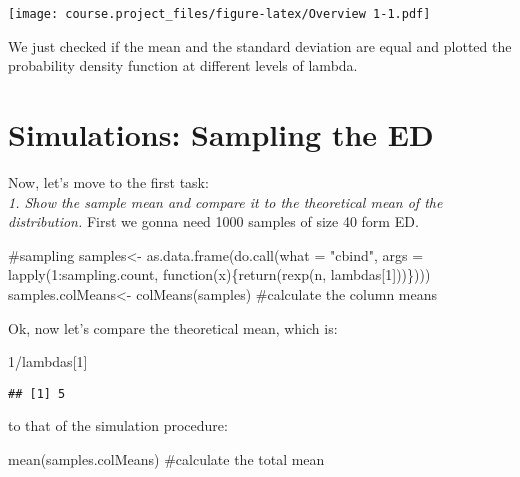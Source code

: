 \documentclass[9pt,]{article}
\newenvironment{Shaded}{}{}
\newcommand{\KeywordTok}[1]{\textcolor[rgb]{0.00,0.00,1.00}{{#1}}}
\newcommand{\DataTypeTok}[1]{{#1}}
\newcommand{\DecValTok}[1]{{#1}}
\newcommand{\StringTok}[1]{\textcolor[rgb]{0.00,0.50,0.50}{{#1}}}
\newcommand{\CommentTok}[1]{\textcolor[rgb]{0.00,0.50,0.00}{{#1}}}
\newcommand{\NormalTok}[1]{{#1}}
\begin{document}
\texttt{[image: course.project\_files/figure-latex/Overview 1-1.pdf]}

We just checked if the mean and the standard deviation are equal and
plotted the probability density function at different levels of lambda.

\section{Simulations: Sampling the
ED}\label{simulations-sampling-the-ed}

Now, let's move to the first task:\\
\emph{1. Show the sample mean and compare it to the theoretical mean of
the distribution.} First we gonna need 1000 samples of size 40 form ED.

\begin{Shaded}
\begin{Highlighting}[]
\CommentTok{#sampling}
\NormalTok{samples<-}\StringTok{ }\KeywordTok{as.data.frame}\NormalTok{(}\KeywordTok{do.call}\NormalTok{(}\DataTypeTok{what =} \StringTok{"cbind"}\NormalTok{, }\DataTypeTok{args =} \KeywordTok{lapply}\NormalTok{(}\DecValTok{1}\NormalTok{:sampling.count, function(x)\{}\KeywordTok{return}\NormalTok{(}\KeywordTok{rexp}\NormalTok{(n, lambdas[}\DecValTok{1}\NormalTok{]))\})))}
\NormalTok{samples.colMeans<-}\StringTok{ }\KeywordTok{colMeans}\NormalTok{(samples) }\CommentTok{#calculate the column means}
\end{Highlighting}
\end{Shaded}

Ok, now let's compare the theoretical mean, which is:

\begin{Shaded}
\begin{Highlighting}[]
\DecValTok{1}\NormalTok{/lambdas[}\DecValTok{1}\NormalTok{]}
\end{Highlighting}
\end{Shaded}

\begin{verbatim}
## [1] 5
\end{verbatim}

to that of the simulation procedure:

\begin{Shaded}
\begin{Highlighting}[]
\KeywordTok{mean}\NormalTok{(samples.colMeans) }\CommentTok{#calculate the total mean}
\end{Highlighting}
\end{Shaded}
\end{document}
